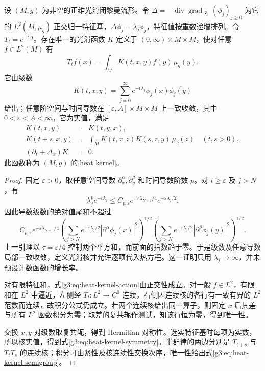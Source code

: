 \begin{theorem}\label{g3:thm:heat-kernel-spectral}
	设 \((M,g)\) 为非空的正维光滑闭黎曼流形。令 \(\Delta=-\operatorname{div}\operatorname{grad}\)，\((\phi_j)_{j\ge0}\) 为它的 \(L^2(M,\mu_g)\) 正交归一特征基，\(\Delta\phi_j=\lambda_j\phi_j\)，特征值按重数递增排列。令 \(T_t=e^{-t\Delta}\)。存在唯一的光滑函数 \(K\) 定义于 \((0,\infty)\times M\times M\)，使对任意 \(f\in L^2(M)\) 有
	\begin{equation}\label{g3:eq:heat-kernel-action}
		T_tf(x)=\int_M K(t,x,y)f(y)\,\mu_g(y).
	\end{equation}
	它由级数
	\begin{equation}\label{g3:eq:heat-kernel-series}
		K(t,x,y)=\sum_{j=0}^\infty e^{-t\lambda_j}
		\phi_j(x)\overline{\phi_j(y)}
	\end{equation}
	给出；任意阶空间与时间导数在 \([\varepsilon,A]\times M\times M\) 上一致收敛，其中 \(0<\varepsilon<A<\infty\)。它为实值，满足
	\begin{align}
		K(t,x,y)&=K(t,y,x),\label{g3:eq:heat-kernel-symmetry}\\
		K(t+s,x,y)&=\int_M K(t,x,z)K(s,z,y)\,\mu_g(z)
		\quad(t,s>0),\label{g3:eq:heat-kernel-semigroup}\\
		(\partial_t+\Delta_x)K&=0.
	\end{align}
	此函数称为 \((M,g)\) 的[heat kernel]。
\end{theorem}
\begin{proof}
	固定 \(\varepsilon>0\)，取任意空间导数 \(\partial_x^\alpha,\partial_y^\beta\) 和时间导数阶数 \(p\)。对 \(t\ge\varepsilon\) 及 \(j>N\)，有
	\[
		\lambda_j^p e^{-t\lambda_j}
		\le C_{p,\varepsilon}e^{-\varepsilon\lambda_{N+1}/4}
		e^{-\varepsilon\lambda_j/2}.
	\]
	因此导数级数的绝对值尾和不超过
	\[
		C_{p,\varepsilon}e^{-\varepsilon\lambda_{N+1}/4}
		\left(\sum_{j>N}e^{-\varepsilon\lambda_j/2}
		|\partial^\alpha\phi_j(x)|^2\right)^{1/2}
		\left(\sum_{j>N}e^{-\varepsilon\lambda_j/2}
		|\partial^\beta\phi_j(y)|^2\right)^{1/2}.
	\]
	上一引理以 \(\tau=\varepsilon/4\) 控制两个平方和，而前面的指数趋于零。于是级数及任意导数局部一致收敛，定义光滑核并允许逐项代入热方程。这一证明只用 \(\lambda_j\to\infty\)，并未预设计数函数的增长率。

	对有限特征和，式\eqref{g3:eq:heat-kernel-action}由正交性成立。对一般 \(f\in L^2\)，有限和在 \(L^2\) 中逼近，左侧经 \(T_t:L^2\to C^0\) 连续，右侧因连续核的各行有一致有界的 \(L^2\) 范数而连续，故积分公式仍成立。若两个连续核给出同一算子，则固定 \(x\) 后其差与所有 \(L^2\) 函数积分为零；取差的复共轭作测试，知该行恒为零，得到唯一性。

	交换 \(x,y\) 对级数取复共轭，得到 Hermitian 对称性。选实特征基时每项为实数，所以核实值，得到式\eqref{g3:eq:heat-kernel-symmetry}。半群律的两边分别是 \(T_{t+s}\) 与 \(T_tT_s\) 的连续核；积分可由紧性及核连续性交换次序，唯一性给出式\eqref{g3:eq:heat-kernel-semigroup}。
\end{proof}

